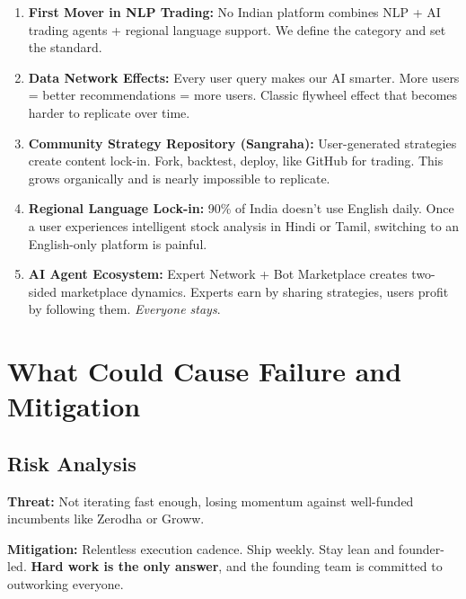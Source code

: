 \documentclass[11pt,a4paper]{article}
\begin{document}
\begin{purplebox}
\begin{enumerate}[leftmargin=*]
    \item \textbf{First Mover in NLP Trading:} No Indian platform combines NLP + AI trading agents + regional language support. We define the category and set the standard.
    
    \item \textbf{Data Network Effects:} Every user query makes our AI smarter. More users = better recommendations = more users. Classic flywheel effect that becomes harder to replicate over time.
    
    \item \textbf{Community Strategy Repository (Sangraha):} User-generated strategies create content lock-in. Fork, backtest, deploy, like GitHub for trading. This grows organically and is nearly impossible to replicate.
    
    \item \textbf{Regional Language Lock-in:} 90\% of India doesn't use English daily. Once a user experiences intelligent stock analysis in Hindi or Tamil, switching to an English-only platform is painful.
    
    \item \textbf{AI Agent Ecosystem:} Expert Network + Bot Marketplace creates two-sided marketplace dynamics. Experts earn by sharing strategies, users profit by following them. \textit{Everyone stays}.
\end{enumerate}
\end{purplebox}

\newpage

\section{What Could Cause Failure and Mitigation}

\subsection{Risk Analysis}

\begin{riskbox}
\textbf{Threat:} Not iterating fast enough, losing momentum against well-funded incumbents like Zerodha or Groww.\\[0.3em]
\begin{fixbox}
\textcolor{primary}{\textbf{Mitigation:}} Relentless execution cadence. Ship weekly. Stay lean and founder-led. \textbf{Hard work is the only answer}, and the founding team is committed to outworking everyone.
\end{fixbox}
\end{riskbox}
\end{document}

